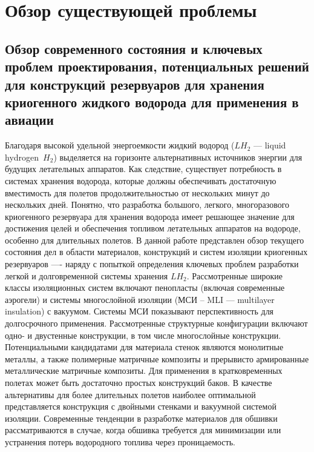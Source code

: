 \chapter{Обзор существующей проблемы}\label{ch:overview}

\section{Обзор современного состояния и ключевых проблем проектирования, потенциальных решений для конструкций резервуаров для хранения криогенного жидкого водорода для применения в авиации}\label{sec:overview/sec1}

Благодаря высокой удельной энергоемкости жидкий водород (\(LH_2\) --- liquid hydrogen~\(H_2\)) выделяется на горизонте альтернативных источников энергии для будущих летательных аппаратов. Как следствие, существует потребность в системах хранения водорода, которые должны обеспечивать достаточную вместимость для полетов продолжительностью от нескольких минут до нескольких дней. Понятно, что разработка большого, легкого, многоразового криогенного резервуара для хранения водорода имеет решающее значение для достижения целей и обеспечения топливом летательных аппаратов на водороде, особенно для длительных полетов. В данной работе  представлен обзор текущего состояния дел в области материалов, конструкций и систем изоляции криогенных резервуаров ---- наряду с попыткой определения ключевых проблем  разработки легкой и долговременной системы хранения \(LH_2\). Рассмотренные широкие классы изоляционных систем включают пенопласты (включая современные аэрогели) и системы многослойной изоляции (МСИ -- MLI --- multilayer insulation) с вакуумом. Системы МСИ показывают перспективность для долгосрочного применения. Рассмотренные структурные конфигурации включают одно- и двустенные конструкции, в том числе многослойные конструкции. Потенциальными кандидатами для материала стенок являются монолитные металлы, а также полимерные матричные композиты и прерывисто армированные металлические матричные композиты. Для применения в кратковременных полетах может быть достаточно простых конструкций баков. В качестве альтернативы для более длительных полетов наиболее оптимальной представляется конструкция с двойными стенками и вакуумной системой изоляции. Современные тенденции в разработке материалов для обшивки рассматриваются в случае, когда обшивка требуется для минимизации или устранения потерь водородного топлива через проницаемость.


